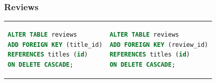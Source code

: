 \documentclass[doubleside, titlepage]{article}
\begin{document}
\subsubsection{Reviews}
\begin{tabular}{ ll }
\begin{minipage}{3in}
\begin{lstlisting}[language=SQL,showspaces=false,basicstyle=\ttfamily,numberstyle=\tiny,commentstyle=\color{gray}
        ]
ALTER TABLE reviews
ADD FOREIGN KEY (title_id)
REFERENCES titles (id)
ON DELETE CASCADE;
\end{lstlisting}
\end{minipage}
&
\begin{minipage}{3in}
\begin{lstlisting}[language=SQL,showspaces=false,basicstyle=\ttfamily,numberstyle=\tiny,commentstyle=\color{gray}
        ]
ALTER TABLE reviews
ADD FOREIGN KEY (review_id)
REFERENCES titles (id)
ON DELETE CASCADE;
\end{lstlisting}
\end{minipage}
\end{tabular}
\end{document}
